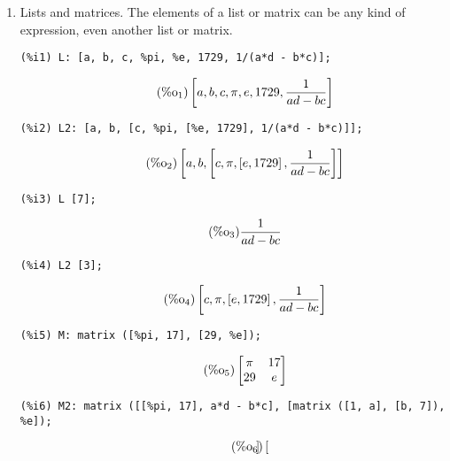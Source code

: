 \documentclass[12pt,leqno]{article}
\begin{document}
\begin{enumerate}
\item Lists and matrices.
The elements of a list or matrix can be any kind of expression,
even another list or matrix.
\begin{verbatim}
(%i1) L: [a, b, c, %pi, %e, 1729, 1/(a*d - b*c)];
\end{verbatim}
\begin{equation}
\tag{$\mathop{\mathrm{\%o}_{1}}$}\left[a, b, c, \pi, e, 1729, \frac{1}{a d-b c}\right]
\label{eq:doc-group1-code8-1-1}
\end{equation}
\begin{verbatim}
(%i2) L2: [a, b, [c, %pi, [%e, 1729], 1/(a*d - b*c)]];
\end{verbatim}
\begin{equation}
\tag{$\mathop{\mathrm{\%o}_{2}}$}\left[a, b, \left[c, \pi, \left[e, 1729\right], \frac{1}{a d-b c}\right]\right]
\label{eq:doc-group1-code8-2-1}
\end{equation}
\begin{verbatim}
(%i3) L [7];
\end{verbatim}
\begin{equation}
\tag{$\mathop{\mathrm{\%o}_{3}}$}\frac{1}{a d-b c}
\label{eq:doc-group1-code8-3-1}
\end{equation}
\begin{verbatim}
(%i4) L2 [3];
\end{verbatim}
\begin{equation}
\tag{$\mathop{\mathrm{\%o}_{4}}$}\left[c, \pi, \left[e, 1729\right], \frac{1}{a d-b c}\right]
\label{eq:doc-group1-code8-4-1}
\end{equation}
\begin{verbatim}
(%i5) M: matrix ([%pi, 17], [29, %e]);
\end{verbatim}
\begin{equation}
\tag{$\mathop{\mathrm{\%o}_{5}}$}\begin{bmatrix}
  \pi & 17\\
  29 & e
\end{bmatrix}
\label{eq:doc-group1-code8-5-1}
\end{equation}
\begin{verbatim}
(%i6) M2: matrix ([[%pi, 17], a*d - b*c], [matrix ([1, a], [b, 7]), %e]);
\end{verbatim}
\begin{equation}
\tag{$\mathop{\mathrm{\%o}_{6}}$}\begin{bmatrix}

\end{bmatrix}
\end{equation}
\end{enumerate}
\end{document}
